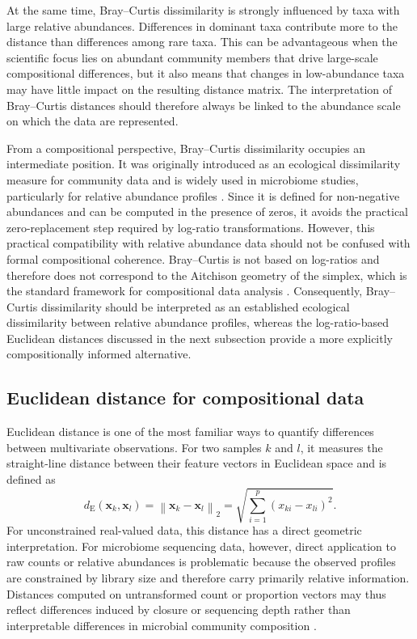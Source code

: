 At the same time, Bray--Curtis dissimilarity is strongly influenced by taxa with large relative abundances. Differences in dominant taxa contribute more to the distance than differences among rare taxa. This can be advantageous when the scientific focus lies on abundant community members that drive large-scale compositional differences, but it also means that changes in low-abundance taxa may have little impact on the resulting distance matrix. The interpretation of Bray--Curtis distances should therefore always be linked to the abundance scale on which the data are represented.

From a compositional perspective, Bray--Curtis dissimilarity occupies an intermediate position. It was originally introduced as an ecological dissimilarity measure for community data \citep{bray1957ordination} and is widely used in microbiome studies, particularly for relative abundance profiles \citep{weiss2017normalization}. Since it is defined for non-negative abundances and can be computed in the presence of zeros, it avoids the practical zero-replacement step required by log-ratio transformations. However, this practical compatibility with relative abundance data should not be confused with formal compositional coherence. Bray--Curtis is not based on log-ratios and therefore does not correspond to the Aitchison geometry of the simplex, which is the standard framework for compositional data analysis \citep{quinn2019field}. Consequently, Bray--Curtis dissimilarity should be interpreted as an established ecological dissimilarity between relative abundance profiles, whereas the log-ratio-based Euclidean distances discussed in the next subsection provide a more explicitly compositionally informed alternative.

\subsection{Euclidean distance for compositional data}
\label{sec:3community:between:euclidean}

Euclidean distance is one of the most familiar ways to quantify differences between multivariate observations. For two samples $k$ and $l$, it measures the straight-line distance between their feature vectors in Euclidean space and is defined as
\begin{equation}
d_{\mathrm{E}}(\mathbf{x}_k,\mathbf{x}_l)=\left\| \mathbf{x}_k - \mathbf{x}_l\right\|_2=\sqrt{\sum_{i=1}^p (x_{ki}-x_{li})^2}.
\label{eq:3community:euclidean_dist}
\end{equation}
For unconstrained real-valued data, this distance has a direct geometric interpretation. For microbiome sequencing data, however, direct application to raw counts or relative abundances is problematic because the observed profiles are constrained by library size and therefore carry primarily relative information. Distances computed on untransformed count or proportion vectors may thus reflect differences induced by closure or sequencing depth rather than interpretable differences in microbial community composition \citep{aitchison1982statistical,aitchison1986statistical,gloor2017microbiome}.


